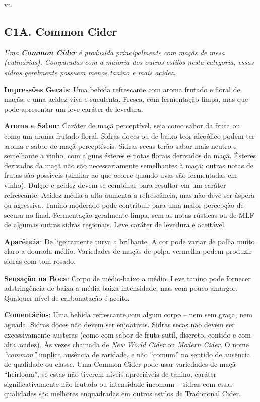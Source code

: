 va
\subsection*{C1A. Common Cider}

\textit{Uma \textbf{Common Cider} é produzida principalmente com maçãs de mesa (culinárias). Comparadas com a maioria dos outros estilos nesta categoria, essas sidras geralmente possuem menos tanino e mais acidez.}

\textbf{Impressões Gerais}: Uma bebida refrescante com aroma frutado e floral de maçãs, e uma acidez viva e suculenta. Fresca, com fermentação limpa, mas que pode apresentar um leve caráter de levedura.

\textbf{Aroma e Sabor}: Caráter de maçã perceptível, seja como sabor da fruta ou como um aroma frutado-floral. Sidras doces ou de baixo teor alcoólico podem ter aroma e sabor de maçã perceptíveis. Sidras secas terão sabor mais neutro e semelhante a vinho, com alguns ésteres e notas florais derivados da maçã. Ésteres derivados da maçã não são necessariamente semelhantes à maçã; outras notas de frutas são possíveis (similar ao que ocorre quando uvas são fermentadas em vinho). Dulçor e acidez devem se combinar para resultar em um caráter refrescante. Acidez média a alta aumenta a refrescância, mas não deve ser áspera ou agressiva. Tanino moderado pode contribuir para uma maior percepção de secura no final. Fermentação geralmente limpa, sem as notas rústicas ou de MLF de algumas outras sidras regionais. Leve caráter de levedura é aceitável.

\textbf{Aparência}: De ligeiramente turva a brilhante. A cor pode variar de palha muito claro a dourada médio. Variedades de maçãs de polpa vermelha podem produzir sidras com tom rosado.

\textbf{Sensação na Boca}: Corpo de médio-baixo a médio. Leve tanino pode fornecer adstringência de baixa a média-baixa intensidade, mas com pouco amargor. Qualquer nível de carbonatação é aceito.

\textbf{Comentários}: Uma bebida refrescante,com algum corpo – nem sem graça, nem aguada. Sidras doces não devem ser enjoativas. Sidras secas não devem ser excessivamente austeras (como com sabor de fruta sutil, discreto, contido e com alta acidez). Às vezes chamada de \textit{New World Cider} ou \textit{Modern Cider}. O nome \textit{“common”} implica ausência de raridade, e não “comum” no sentido de ausência de qualidade ou classe. Uma Common Cider pode usar variedades de maçã “heirloom”, se estas não tiverem níveis apreciáveis de tanino, caráter significativamente não-frutado ou intensidade incomum – sidras com essas qualidades são melhores enquadradas em outros estilos de Tradicional Cider.

